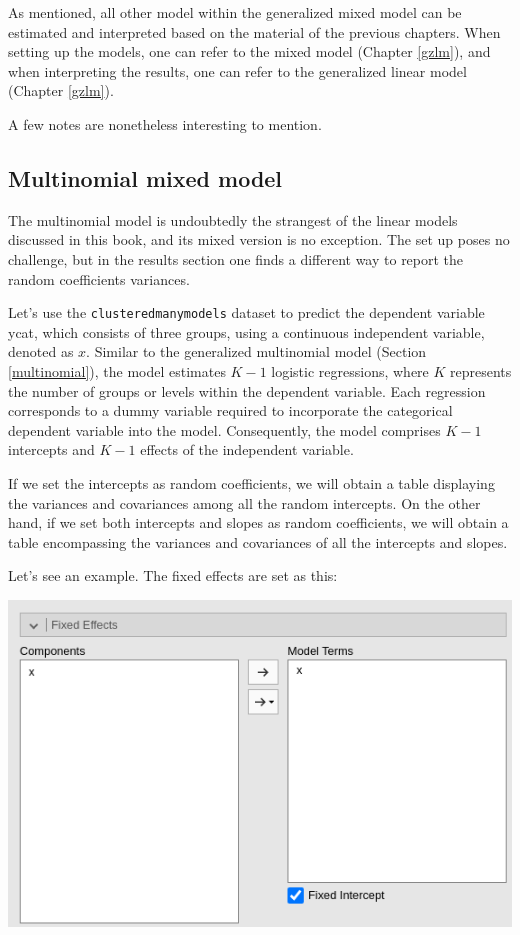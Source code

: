 \documentclass[
]{book}
\begin{document}
As mentioned, all other model within the generalized mixed model can be estimated and interpreted based on the material of the previous chapters. When setting up the models, one can refer to the mixed model (Chapter \ref{gzlm}), and when interpreting the results, one can refer to the generalized linear model (Chapter \ref{gzlm}).

A few notes are nonetheless interesting to mention.

\hypertarget{multinomial-mixed-model}{%
\subsection{Multinomial mixed model}\label{multinomial-mixed-model}}

The multinomial model is undoubtedly the strangest of the linear models discussed in this book, and its mixed version is no exception. The set up poses no challenge, but in the results section one finds a different way to report the random coefficients variances.

Let's use the \texttt{clusteredmanymodels} dataset to predict the dependent variable ycat, which consists of three groups, using a continuous independent variable, denoted as \(x\). Similar to the generalized multinomial model (Section \ref{multinomial}), the model estimates \(K-1\) logistic regressions, where \(K\) represents the number of groups or levels within the dependent variable. Each regression corresponds to a dummy variable required to incorporate the categorical dependent variable into the model. Consequently, the model comprises \(K-1\) intercepts and \(K-1\) effects of the independent variable.

If we set the intercepts as random coefficients, we will obtain a table displaying the variances and covariances among all the random intercepts. On the other hand, if we set both intercepts and slopes as random coefficients, we will obtain a table encompassing the variances and covariances of all the intercepts and slopes.

Let's see an example. The fixed effects are set as this:

\includegraphics[width=0.7\linewidth]{bookletpics/5_multinomial_input1}
\end{document}
